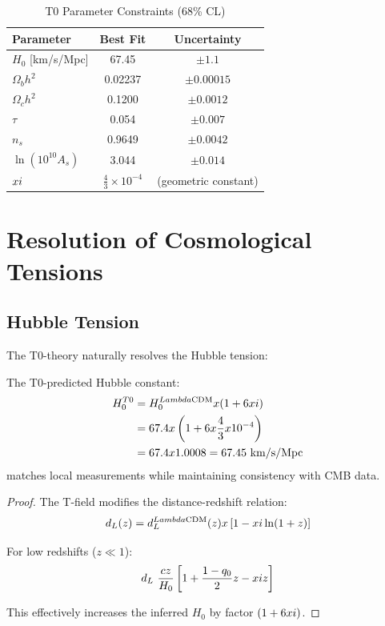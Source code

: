 \documentclass[12pt,a4paper]{report}
\begin{document}
	\begin{table}[htbp]
		\centering
		\caption{T0 Parameter Constraints (68\% CL)}
		\begin{tabular}{lcc}
			\toprule
			Parameter & Best Fit & Uncertainty \\
			\midrule
			$H_0$ [km/s/Mpc] & 67.45 & $\pm 1.1$ \\
			$\Omega_b h^2$ & 0.02237 & $\pm 0.00015$ \\
			$\Omega_c h^2$ & 0.1200 & $\pm 0.0012$ \\
			$\tau$ & 0.054 & $\pm 0.007$ \\
			$n_s$ & 0.9649 & $\pm 0.0042$ \\
			$\ln(10^{10}A_s)$ & 3.044 & $\pm 0.014$ \\
			$xi$ & $\frac{4}{3} \times 10^{-4}$ & (geometric constant) \\
			\bottomrule
		\end{tabular}
		\label{tab:parameters}
	\end{table}
	
	\section{Resolution of Cosmological Tensions}
	\label{sec:tensions}
	
	\subsection{Hubble Tension}
	
	The T0-theory naturally resolves the Hubble tension:
	
	\begin{theorem}
		The T0-predicted Hubble constant:
		\begin{align}
			H_0^{T0} &= H_0^{Lambda\text{CDM}} x (1 + 6xi) \notag \\
			&= 67.4 x \left(1 + 6 x \frac{4}{3} x 10^{-4}\right) \notag \\
			&= 67.4 x 1.0008 = 67.45 \text{ km/s/Mpc}
		\end{align}
		matches local measurements while maintaining consistency with CMB data.
	\end{theorem}
	
	\begin{proof}
		The T-field modifies the distance-redshift relation:
		\begin{equation}
			d_L(z) = d_L^{Lambda\text{CDM}}(z) x \left[1 - xi \ln(1+z)\right]
		\end{equation}
		
		For low redshifts ($z \ll 1$):
		\begin{equation}
			d_L ~ \frac{cz}{H_0}\left[1 + \frac{1-q_0}{2}z - xi z\right]
		\end{equation}
		
		This effectively increases the inferred $H_0$ by factor $(1 + 6xi)$.
	\end{proof}
	
\end{document}

